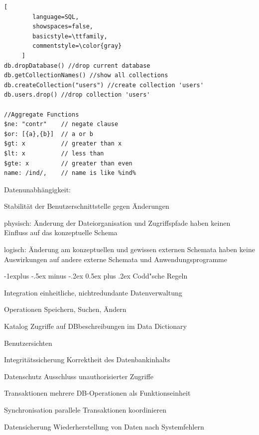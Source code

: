 \documentclass[a4paper]{article}
\makeatletter
\renewcommand{\subsection}{\@startsection{subsection}{2}{0mm}%
                                {-1explus -.5ex minus -.2ex}%
                                {0.5ex plus .2ex}%
                                {\normalfont\normalsize\bfseries}}
\makeatother
\begin{document}
\begin{multicols}{3}
\begin{lstlisting}[
        language=SQL,
        showspaces=false,
        basicstyle=\ttfamily,
        commentstyle=\color{gray}
     ]
db.dropDatabase() //drop current database
db.getCollectionNames() //show all collections
db.createCollection("users") //create collection 'users' 	
db.users.drop() //drop collection 'users'

//Aggregate Functions
$ne: "contr"    // negate clause
$or: [{a},{b}]  // a or b
$gt: x          // greater than x
$lt: x          // less than
$gte: x         // greater than even
name: /ind/,    // name is like %ind%

\end{lstlisting}

    Datenunabhängigkeit:
    \begin{itemize*}
        \item Stabilität der Benutzerschnittstelle gegen Änderungen
        \item physisch: Änderung der Dateiorganisation und Zugriffspfade haben keinen Einfluss auf das konzeptuelle Schema
        \item logisch: Änderung am konzeptuellen und gewissen externen Schemata haben keine Auswirkungen auf andere externe Schemata und Anwendungsprogramme
    \end{itemize*}

    \subsection{Codd"sche Regeln}
    \begin{description*}
        \item[Integration] einheitliche, nichtredundante Datenverwaltung
        \item[Operationen] Speichern, Suchen, Ändern
        \item[Katalog] Zugriffe auf DBbeschreibungen im Data Dictionary
        \item[Benutzersichten]
        \item[Integritätssicherung] Korrektheit des Datenbankinhalts
        \item[Datenschutz] Ausschluss unauthorisierter Zugriffe
        \item[Transaktionen] mehrere DB-Operationen als Funktionseinheit
        \item[Synchronisation] parallele Transaktionen koordinieren
        \item[Datensicherung] Wiederherstellung von Daten nach Systemfehlern
    \end{description*}


\end{multicols}
\end{document}
